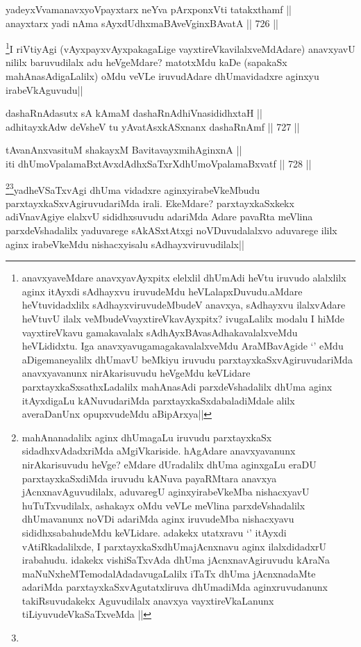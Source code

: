 
\begin{shl}
yadeyxVvamanavxyoV\s payxtarx neYva pArxponxVti tatakxthamf || \\
anayxtarx yadi nAma sAyxdUdhxmaBAveV\s ginxBAvatA ||  726 ||  
\end{shl}

\begin{artha}
\footnote{anavxyaveMdare anavxyavAyxpitx elelxlil dhUmAdi heVtu iruvudo alalxlilx aginx itAyxdi sAdhayxvu iruvudeMdu heVLalapxDuvudu.aMdare heVtuvidadxlilx sAdhayxviruvudeMbudeV anavxya, sAdhayxvu ilalxvAdare heVtuvU ilalx veMbudeVvayxtireVkavAyxpitx? ivugaLalilx modalu I hiMde vayxtireVkavu gamakavalalx sAdhAyxBAvasAdhakavalalxveMdu heVLididxtu. Iga anavxyavugamagakavalalxveMdu AraMBavAgide `\stext' eMdu aDigemaneyalilx dhUmavU beMkiyu iruvudu parxtayxkaSxvAgiruvudariMda anavxyavanunx nirAkarisuvudu heVgeMdu keVLidare parxtayxkaSxsathxLadalilx mahAnasAdi parxdeVshadalilx dhUma aginx itAyxdigaLu kANuvudariMda parxtayxkaSxdabaladiMdale alilx averaDanUnx opupxvudeMdu aBipArxya||}I riVtiyAgi (vAyxpayxvAyxpakagaLige vayxtireVkavilalxveMdAdare) anavxyavU nililx baruvudilalx adu heVgeMdare? matotxMdu kaDe (sapakaSx mahAnasAdigaLalilx) oMdu veVLe iruvudAdare dhUmavidadxre aginxyu irabeVkAguvudu||
\end{artha}

\begin{shl}
dashaRnAdasutx sA kAmaM dashaRnAdhiVnasididhxtaH || \\
adhitayxkAdw deVsheV tu yAvatAsxkASxnanx dashaRnAmf ||  727 ||  
\end{shl}

\begin{shl}
tAvanAnxvasituM shakayxM BavitavayxmihAginxnA || \\
iti dhUmoVpalamaBxtAvxdAdhxSaTxrXdhUmoVpalamaBxvatf ||  728 ||  
\end{shl}

\begin{artha}
\footnote{mahAnanadalilx aginx dhUmagaLu iruvudu parxtayxkaSx sidadhxvAdadxriMda aMgiVkariside. hAgAdare anavxyavanunx nirAkarisuvudu heVge? eMdare dUradalilx dhUma aginxgaLu eraDU parxtayxkaSxdiMda iruvudu kANuva payaRMtara anavxya jAcnxnavAguvudilalx, aduvaregU aginxyirabeVkeMba nishacxyavU huTuTxvudilalx, ashakayx oMdu veVLe meVlina parxdeVshadalilx dhUmavanunx noVDi adariMda aginx iruvudeMba nishacxyavu sididhxsabahudeMdu keVLidare. adakekx utatxravu `\stext' itAyxdi vAtiRkadalilxde, I parxtayxkaSxdhUmajAcnxnavu aginx ilalxdidadxrU irabahudu. idakekx vishiSaTxvAda dhUma jAcnxnavAgiruvudu kAraNa maNuNxheMTemodalAdadavugaLalilx iTaTx dhUma jAcnxnadaMte adariMda parxtayxkaSxvAgutatxliruva dhUmadiMda aginxruvudanunx takiRsuvudakekx Aguvudilalx anavxya vayxtireVkaLanunx tiLiyuvudeVkaSaTxveMda ||}\footnote{}yadheVSaTxvAgi dhUma vidadxre aginxyirabeVkeMbudu parxtayxkaSxvAgiruvudariMda irali. EkeMdare? parxtayxkaSxkekx adiVnavAgiye elalxvU sididhxsuvudu adariMda Adare pavaRta meVlina parxdeVshadalilx yaduvarege sAkASxtAtxgi noVDuvudalalxvo aduvarege ililx aginx irabeVkeMdu nishacxyisalu sAdhayxviruvudilalx||
\end{artha}


